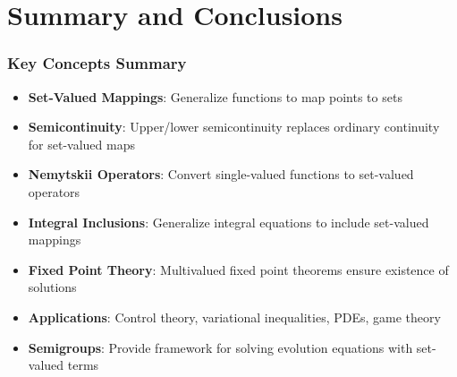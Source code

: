 \documentclass[aspectratio=169,10pt]{beamer}
\begin{document}

\section{Summary and Conclusions}

\begin{frame}
\frametitle{Key Concepts Summary}

\begin{itemize}
    \item \textbf{Set-Valued Mappings}: Generalize functions to map points to sets

    \vspace{0.3cm}

    \item \textbf{Semicontinuity}: Upper/lower semicontinuity replaces ordinary continuity for set-valued maps

    \vspace{0.3cm}

    \item \textbf{Nemytskii Operators}: Convert single-valued functions to set-valued operators

    \vspace{0.3cm}

    \item \textbf{Integral Inclusions}: Generalize integral equations to include set-valued mappings

    \vspace{0.3cm}

    \item \textbf{Fixed Point Theory}: Multivalued fixed point theorems ensure existence of solutions

    \vspace{0.3cm}

    \item \textbf{Applications}: Control theory, variational inequalities, PDEs, game theory

    \vspace{0.3cm}

    \item \textbf{Semigroups}: Provide framework for solving evolution equations with set-valued terms

\end{itemize}

\end{frame}
\end{document}

